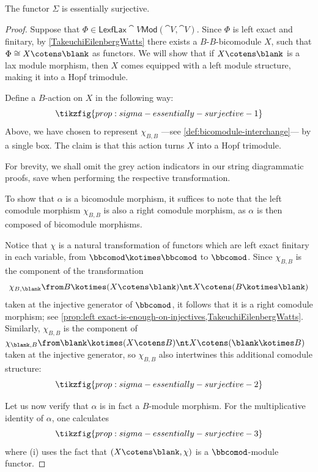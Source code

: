 \newpage%
\begin{proposition}\label{prop:sigma-essentially-surjective}
  The functor \(\Sigma\) is essentially surjective.
\end{proposition}
\begin{proof}
  Suppose that \(\Phi \in \mathsf{LexfLax}\cat{V}\mathsf{Mod}(\cat{V},\cat{V})\).
  Since \(\Phi\) is left exact and finitary,
  by \cref{TakeuchiEilenbergWatts}
  there exists a \(B\)\hyp{}\(B\)\hyp{}bicomodule \(X\),
  such that \(\Phi \cong X \cotens \blank\) as functors.
  We will show that if \(X \cotens \blank\) is a lax module morphism,
  then \(X\) comes equipped with a left module structure,
  making it into a Hopf trimodule.

  Define a \(B\)\hyp{}action on \(X\) in the following way:
  \[
    \tikzfig{prop:sigma-essentially-surjective-1}
  \]
  Above, we have chosen to represent \(\chi_{B,B}\)%
  —see \cref{def:bicomodule-interchange}—%
  by a single box.
  The claim is that this action turns \(X\) into a Hopf trimodule.

  For brevity, we shall omit the grey action indicators in our string diagrammatic proofs,
  save when performing the respective transformation.

  To show that \(\alpha\) is a bicomodule morphism,
  it suffices to note that the left comodule morphism \(\chi_{B,B}\) is also a right comodule morphism,
  as \(\alpha\) is then composed of bicomodule morphisms.

  Notice that \(\chi\) is a natural transformation of functors which are left exact finitary in each variable, from
  \(\bbcomod \kotimes \bbcomod\) to \(\bbcomod\).
  Since \(\chi_{B,B}\) is the component of the transformation
  \[
    \chi_{B,\blank}\from B \kotimes (X \cotens \blank) \nt X \cotens (B \kotimes \blank)
  \]
  taken at the injective generator of \( \bbcomod \),
  it follows that it is a right comodule morphism;
  see \cref{prop:left exact-is-enough-on-injectives,TakeuchiEilenbergWatts}.
  Similarly, \(\chi_{B,B}\) is the component of \( \chi_{\blank,B}\from \blank \kotimes (X \cotens B) \nt X \cotens (\blank \kotimes B) \)
  taken at the injective generator,
  so \(\chi_{B,B}\) also intertwines this additional comodule structure:
  \[
    \tikzfig{prop:sigma-essentially-surjective-2}
  \]

  Let us now verify that \(\alpha\) is in fact a \(B\)\hyp{}module morphism.
  For the multiplicative identity of \(\alpha\), one calculates
  \[
    \tikzfig{prop:sigma-essentially-surjective-3}
  \]
  where (i) uses the fact that \((X \cotens \blank, \chi)\) is a \(\bbcomod\)\hyp{}module functor.


\end{proof}
